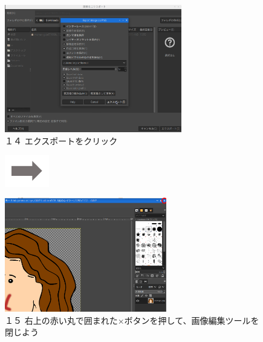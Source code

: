 \documentclass[a4paper,12pt]{jarticle}
\begin{document}
\begin{figure}
  \bigskip


  \begin{minipage}{\textwidth}
    \begin{minipage}{8.074cm}
      \includegraphics[width=7.721cm]{textbook-img134.png}\\
      １４ エクスポートをクリック
    \end{minipage}
    \includegraphics[width=1.919cm]{textbook-img135.png}
    \begin{minipage}{7.328cm}
      \includegraphics[width=7.061cm]{textbook-img1030.png}\\
      １５
      右上の赤い丸で囲まれた×ボタンを押して、画像編集ツールを閉じよう
    \end{minipage}
  \end{minipage}



\end{figure}
\clearpage
\end{document}
